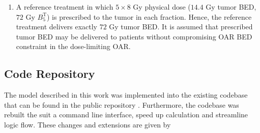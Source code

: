 \documentclass[\relativeRoot/ada.tex]{subfiles}
\begin{document}
\begin{enumerate}
    \item A reference treatment in which $5 \times 8$ Gy physical dose ($14.4$ Gy tumor BED, $72$ Gy $B_5^{\text{T}}$) is prescribed to the tumor in each fraction. Hence, the reference treatment delivers exactly $72$ Gy tumor BED. It is assumed that prescribed tumor BED may be delivered to patients without compromising OAR BED constraint in the dose-limiting OAR.

%    

\end{enumerate}

\subsection{Code Repository}

The model described in this work was implemented into the existing codebase that can be found in the public repository \cite{adaptfx_package}. Furthermore, the codebase was rebuilt the suit a command line interface, speed up calculation and streamline logic flow. These changes and extensions are given by
\end{document}

